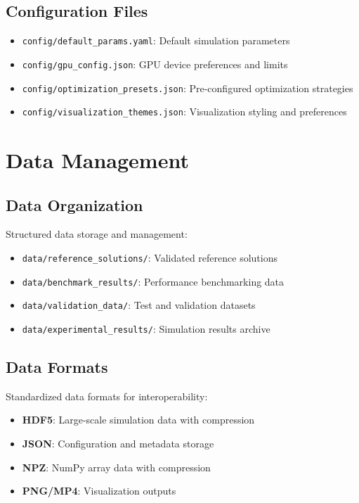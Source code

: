 \documentclass{article}
\begin{document}
\subsection{Configuration Files}

\begin{itemize}
\item \texttt{config/default\_params.yaml}: Default simulation parameters
\item \texttt{config/gpu\_config.json}: GPU device preferences and limits
\item \texttt{config/optimization\_presets.json}: Pre-configured optimization strategies
\item \texttt{config/visualization\_themes.json}: Visualization styling and preferences
\end{itemize}

\section{Data Management}

\subsection{Data Organization}

Structured data storage and management:

\begin{itemize}
\item \texttt{data/reference\_solutions/}: Validated reference solutions
\item \texttt{data/benchmark\_results/}: Performance benchmarking data
\item \texttt{data/validation\_data/}: Test and validation datasets
\item \texttt{data/experimental\_results/}: Simulation results archive
\end{itemize}

\subsection{Data Formats}

Standardized data formats for interoperability:

\begin{itemize}
\item \textbf{HDF5}: Large-scale simulation data with compression
\item \textbf{JSON}: Configuration and metadata storage
\item \textbf{NPZ}: NumPy array data with compression
\item \textbf{PNG/MP4}: Visualization outputs
\end{itemize}
\end{document}
